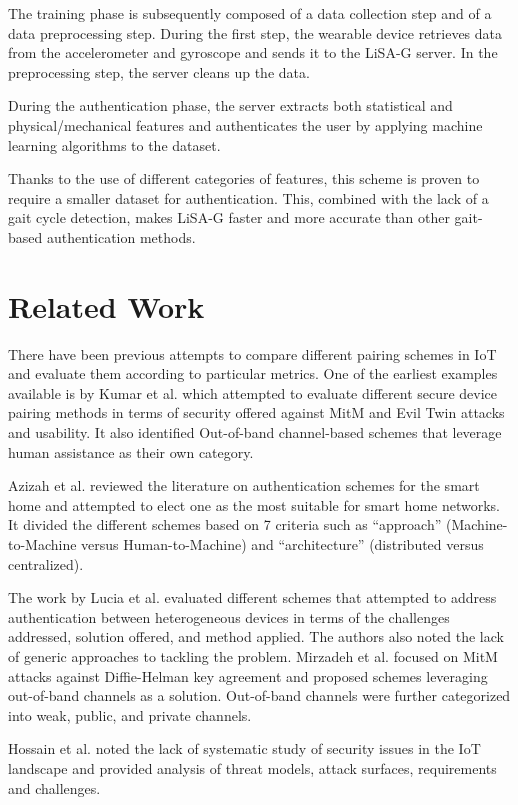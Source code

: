 \documentclass[10pt,twocolumn,letterpaper]{article}
\begin{document}
The training phase is subsequently composed of a data collection step and of a data preprocessing step. During the first step, the wearable device retrieves data from the accelerometer and gyroscope and sends it to the LiSA-G server. In the preprocessing step, the server cleans up the data.

During the authentication phase, the server extracts both statistical and physical/mechanical features and authenticates the user by applying machine learning algorithms to the dataset.

Thanks to the use of different categories of features, this scheme is proven to require a smaller dataset for authentication. This, combined with the lack of a gait cycle detection, makes LiSA-G faster and more accurate than other gait-based authentication methods.


\section{Related Work}

There have been previous attempts to compare different pairing schemes in IoT and evaluate them according to particular metrics. One of the earliest examples available is by Kumar et al. \cite{kumar}  which attempted to evaluate different secure device pairing methods in terms of security offered against MitM and Evil Twin attacks and usability. It also identified Out-of-band channel-based schemes that leverage human assistance as their own category. 

Azizah et al. \cite{iot_comparison} reviewed the literature on authentication schemes for the smart home and attempted to elect one as the most suitable for smart home networks. It divided the different schemes based on 7 criteria such as “approach” (Machine-to-Machine versus Human-to-Machine) and “architecture” (distributed versus centralized). 

The work by Lucia et al. \cite{iot_review_survey} evaluated different schemes that attempted to address authentication between heterogeneous devices in terms of the challenges addressed, solution offered, and method applied. The authors also noted the lack of generic approaches to tackling the problem.  Mirzadeh et al. \cite{pairing_survey} focused on MitM attacks against Diffie-Helman key agreement and proposed schemes leveraging out-of-band channels as a solution. Out-of-band channels were further categorized into weak, public, and private channels. 

Hossain et al. \cite{iot_sec_analysis} noted the lack of systematic study of security issues in the IoT landscape and provided analysis of threat models, attack surfaces, requirements and challenges.
\end{document}

